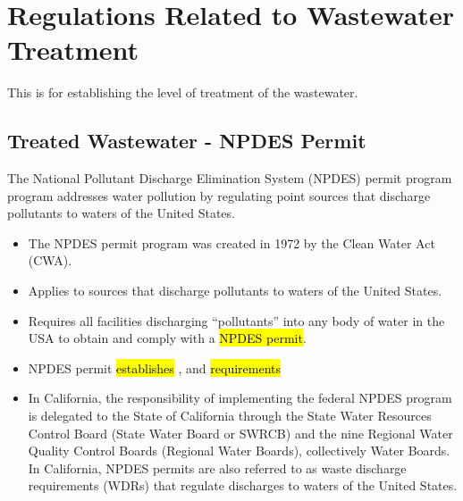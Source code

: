 \documentclass{article}
\begin{document}
\section{Regulations Related to Wastewater Treatment}
This is for establishing the level of treatment of the wastewater.
\subsection{Treated Wastewater - NPDES Permit}
The National Pollutant Discharge Elimination System (NPDES) permit program program addresses water pollution by regulating point sources that discharge pollutants to waters of the United States.

\begin{itemize}
\item The NPDES permit program was created in 1972 by the Clean Water Act (CWA).
\item Applies to sources that discharge pollutants to waters of the United States.
\item Requires all facilities discharging “pollutants” into any body of water in the USA to obtain and comply with a \hl{NPDES permit}.
\item NPDES permit \hl{establishes} ,  and  \hl{requirements}\\
\item In California, the responsibility of implementing the federal NPDES program is delegated to the State of California through the State Water Resources Control Board (State Water Board or SWRCB) and the nine Regional Water Quality Control Boards (Regional Water Boards), collectively Water Boards. In California, NPDES permits are also referred to as waste discharge requirements (WDRs) that regulate discharges to waters of the United States.
\end{itemize}
\end{document}
